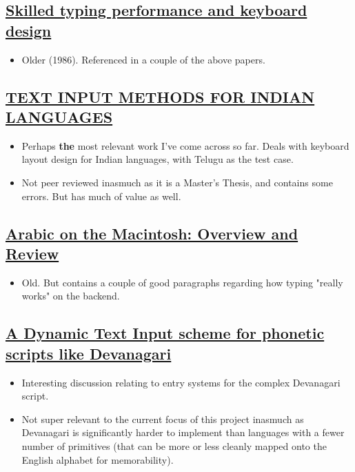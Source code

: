 \documentclass[11pt]{article}
\begin{document}
\subsection{\href{https://link.springer.com/article/10.1007\%2FBF02686608}{Skilled typing performance and keyboard design}}
\label{sec:org6368736}

\begin{itemize}
\item Older (1986). Referenced in a couple of the above papers.
\end{itemize}

\subsection{\href{https://researchweb.iiit.ac.in/\~sowmya\_vb/msthesis.pdf}{TEXT INPUT METHODS FOR INDIAN LANGUAGES}}
\label{sec:orgc5e487e}

\begin{itemize}
\item Perhaps \textbf{the} most relevant work I've come across so far. Deals with keyboard layout design for Indian languages, with Telugu as the test case.
\item Not peer reviewed inasmuch as it is a Master's Thesis, and contains some errors. But has much of value as well.
\end{itemize}

\subsection{\href{https://www.jstor.org/stable/23063782}{Arabic on the Macintosh: Overview and Review}}
\label{sec:org67be06d}

\begin{itemize}
\item Old. But contains a couple of good paragraphs regarding how typing "really works" on the backend.
\end{itemize}

\subsection{\href{https://www.academia.edu/6098604/A\_Dynamic\_Text\_Input\_scheme\_for\_phonetic\_scripts\_like\_Devanagari}{A Dynamic Text Input scheme for phonetic scripts like Devanagari}}
\label{sec:org5df7d53}

\begin{itemize}
\item Interesting discussion relating to entry systems for the complex Devanagari script.
\item Not super relevant to the current focus of this project inasmuch as Devanagari is significantly harder to implement than languages with a fewer number of primitives (that can be more or less cleanly mapped onto the English alphabet for memorability).
\end{itemize}
\end{document}
